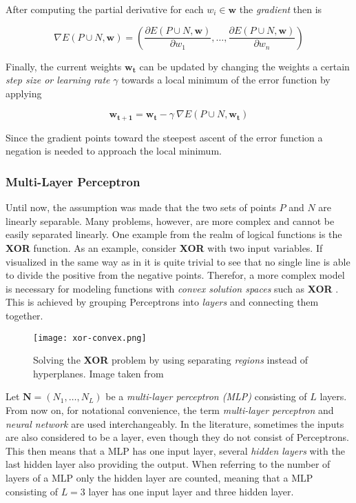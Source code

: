 After computing the partial derivative for each $w_i \in \bm{w}$ the \textit{gradient} then is

\begin{equation}
    \nabla E(P \cup N, \bm{w}) = \left(\frac{\partial E(P \cup N, \bm{w})}{\partial w_1}, \dots, \frac{\partial E(P \cup N, \bm{w})}{\partial w_n} \right)
\end{equation}

Finally, the current weights $\bm{w_t}$ can be updated by changing the weights a certain \textit{step size or learning rate} $\gamma$ towards a local minimum of the error function by applying

\begin{equation}
    \label{eq:gradient-binary-update}
    \bm{w_{t+1}} = \bm{w_t} - \gamma ~ \nabla E(P \cup N, \bm{w_t})
\end{equation}

Since the gradient points toward the steepest ascent of the error function a negation is needed to approach the local minimum.

\subsubsection{Multi-Layer Perceptron}
Until now, the assumption was made that the two sets of points $P$ and $N$ are linearly separable.
Many problems, however, are more complex and cannot be easily separated linearly.
One example from the realm of logical functions is the \textbf{XOR} function.
As an example, consider \textbf{XOR} with two input variables.
If visualized in the same way as in  it is quite trivial to see that no single line is able to divide the positive from the negative points.
Therefor, a more complex model is necessary for modeling functions with \textit{convex solution spaces} such as \textbf{XOR} .
This is achieved by grouping Perceptrons into \textit{layers} and connecting them together.

\begin{figure}[htb!]
    \centering
    \texttt{[image: xor-convex.png]}
    \caption{Solving the \textbf{XOR} problem by using separating \textit{regions} instead of hyperplanes. Image taken from \cite{rojas_neural_1996}}
    \label{fig:xor-convex}
\end{figure}

Let $\bm{N} = (N_1, \dots, N_L)$ be a \textit{multi-layer perceptron (MLP)} consisting of $L$ layers.
From now on, for notational convenience, the term \textit{multi-layer perceptron} and \textit{neural network} are used interchangeably.
In the literature, sometimes the inputs are also considered to be a layer, even though they do not consist of Perceptrons.
This then means that a MLP has one input layer, several \textit{hidden layers} with the last hidden layer also providing the output.
When referring to the number of layers of a MLP only the hidden layer are counted, meaning that a MLP consisting of $L=3$ layer has one input layer and three hidden layer.

